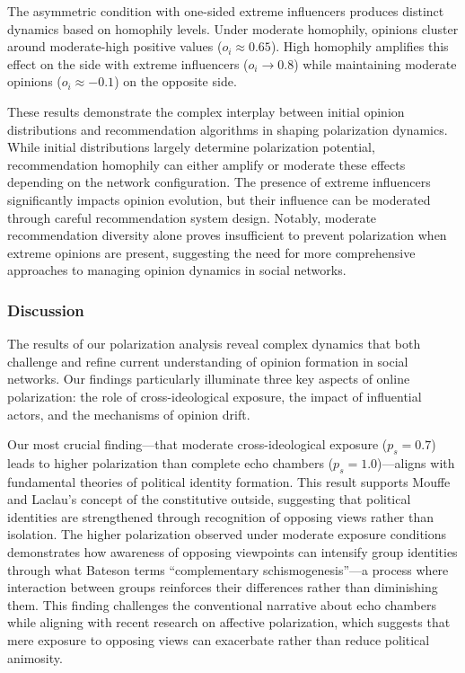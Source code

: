 The asymmetric condition with one-sided extreme influencers produces distinct dynamics based on homophily levels. Under moderate homophily, opinions cluster around moderate-high positive values ($o_i \approx 0.65$). High homophily amplifies this effect on the side with extreme influencers ($o_i \rightarrow 0.8$) while maintaining moderate opinions ($o_i \approx -0.1$) on the opposite side.

These results demonstrate the complex interplay between initial opinion distributions and recommendation algorithms in shaping polarization dynamics. While initial distributions largely determine polarization potential, recommendation homophily can either amplify or moderate these effects depending on the network configuration. The presence of extreme influencers significantly impacts opinion evolution, but their influence can be moderated through careful recommendation system design. Notably, moderate recommendation diversity alone proves insufficient to prevent polarization when extreme opinions are present, suggesting the need for more comprehensive approaches to managing opinion dynamics in social networks.

\subsubsection{Discussion}

The results of our polarization analysis reveal complex dynamics that both challenge and refine current understanding of opinion formation in social networks. Our findings particularly illuminate three key aspects of online polarization: the role of cross-ideological exposure, the impact of influential actors, and the mechanisms of opinion drift.

Our most crucial finding---that moderate cross-ideological exposure ($p_s = 0.7$) leads to higher polarization than complete echo chambers ($p_s = 1.0$)---aligns with fundamental theories of political identity formation. This result supports Mouffe and Laclau's concept of the constitutive outside, suggesting that political identities are strengthened through recognition of opposing views rather than isolation. The higher polarization observed under moderate exposure conditions demonstrates how awareness of opposing viewpoints can intensify group identities through what Bateson terms ``complementary schismogenesis''---a process where interaction between groups reinforces their differences rather than diminishing them. This finding challenges the conventional narrative about echo chambers while aligning with recent research on affective polarization, which suggests that mere exposure to opposing views can exacerbate rather than reduce political animosity.


